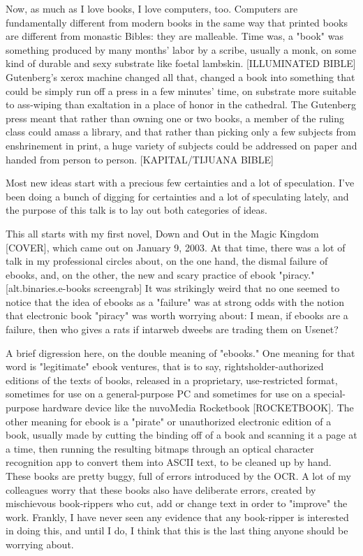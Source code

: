 Now, as much as I love books, I love computers, too. Computers are
fundamentally different from modern books in the same way that
printed books are different from monastic Bibles: they are
malleable. Time was, a "book" was something produced by many
months' labor by a scribe, usually a monk, on some kind of durable
and sexy substrate like foetal lambskin. [ILLUMINATED BIBLE]
Gutenberg's xerox machine changed all that, changed a book into
something that could be simply run off a press in a few minutes'
time, on substrate more suitable to ass-wiping than exaltation in a
place of honor in the cathedral. The Gutenberg press meant that
rather than owning one or two books, a member of the ruling class
could amass a library, and that rather than picking only a few
subjects from enshrinement in print, a huge variety of subjects
could be addressed on paper and handed from person to person.
[KAPITAL/TIJUANA BIBLE]

Most new ideas start with a precious few certainties and a lot of
speculation. I've been doing a bunch of digging for certainties and
a lot of speculating lately, and the purpose of this talk is to lay
out both categories of ideas.

This all starts with my first novel, Down and Out in the Magic
Kingdom [COVER], which came out on January 9, 2003. At that time,
there was a lot of talk in my professional circles about, on the
one hand, the dismal failure of ebooks, and, on the other, the new
and scary practice of ebook "piracy." [alt.binaries.e-books
screengrab] It was strikingly weird that no one seemed to notice
that the idea of ebooks as a "failure" was at strong odds with the
notion that electronic book "piracy" was worth worrying about: I
mean, if ebooks are a failure, then who gives a rats if intarweb
dweebs are trading them on Usenet?

A brief digression here, on the double meaning of "ebooks." One
meaning for that word is "legitimate" ebook ventures, that is to
say, rightsholder-authorized editions of the texts of books,
released in a proprietary, use-restricted format, sometimes for use
on a general-purpose PC and sometimes for use on a special-purpose
hardware device like the nuvoMedia Rocketbook [ROCKETBOOK]. The
other meaning for ebook is a "pirate" or unauthorized electronic
edition of a book, usually made by cutting the binding off of a
book and scanning it a page at a time, then running the resulting
bitmaps through an optical character recognition app to convert
them into ASCII text, to be cleaned up by hand. These books are
pretty buggy, full of errors introduced by the OCR. A lot of my
colleagues worry that these books also have deliberate errors,
created by mischievous book-rippers who cut, add or change text in
order to "improve" the work. Frankly, I have never seen any
evidence that any book-ripper is interested in doing this, and
until I do, I think that this is the last thing anyone should be
worrying about.

